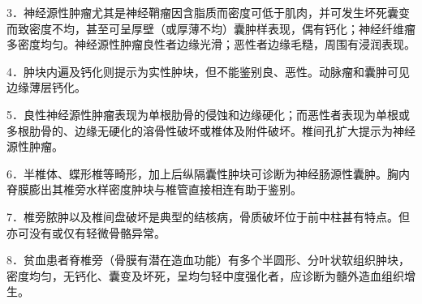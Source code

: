 3．神经源性肿瘤尤其是神经鞘瘤因含脂质而密度可低于肌肉，并可发生坏死囊变而致密度不均，甚至可呈厚壁（或厚薄不均）囊肿样表现，偶有钙化；神经纤维瘤多密度均匀。神经源性肿瘤良性者边缘光滑；恶性者边缘毛糙，周围有浸润表现。

4．肿块内遍及钙化则提示为实性肿块，但不能鉴别良、恶性。动脉瘤和囊肿可见边缘薄层钙化。

5．良性神经源性肿瘤表现为单根肋骨的侵蚀和边缘硬化；而恶性者表现为单根或多根肋骨的、边缘无硬化的溶骨性破坏或椎体及附件破坏。椎间孔扩大提示为神经源性肿瘤。

6．半椎体、蝶形椎等畸形，加上后纵隔囊性肿块可诊断为神经肠源性囊肿。胸内脊膜膨出其椎旁水样密度肿块与椎管直接相连有助于鉴别。

7．椎旁脓肿以及椎间盘破坏是典型的结核病，骨质破坏位于前中柱甚有特点。但亦可没有或仅有轻微骨骼异常。

8．贫血患者脊椎旁（骨膜有潜在造血功能）有多个半圆形、分叶状软组织肿块，密度均匀，无钙化、囊变及坏死，呈均匀轻中度强化者，应诊断为髓外造血组织增生。

\protect\hypertarget{text00017.html}{}{}


